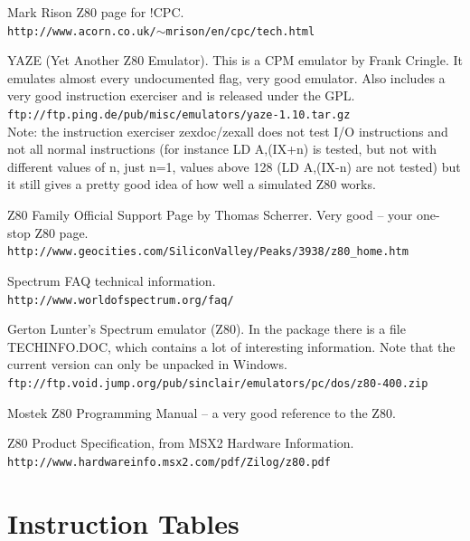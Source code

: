 \documentclass[oneside,a4paper]{book}
\begin{document}
\begin{thebibliography}{}

   Mark Rison Z80 page for !CPC. \\
   {\tt \small http://www.acorn.co.uk/$\sim$mrison/en/cpc/tech.html}

  YAZE (Yet Another Z80 Emulator). This is a CPM emulator 
   by Frank Cringle. It emulates almost every undocumented flag, very good
   emulator. Also includes a very good instruction exerciser and is released
   under the GPL. \\
   {\tt \small ftp://ftp.ping.de/pub/misc/emulators/yaze-1.10.tar.gz} \\
   Note: the instruction exerciser zexdoc/zexall does not test I/O instructions 
   and not all normal instructions (for instance LD A,(IX+n) is tested, but not 
   with different values of n, just n=1, values above 128 (LD A,(IX-n) are not 
   tested) but it still gives a pretty good idea of how well a simulated Z80 
   works.
   
  Z80 Family Official Support Page by Thomas Scherrer. Very 
   good -- your one-stop Z80 page. \\
   {\tt \small http://www.geocities.com/SiliconValley/Peaks/3938/z80\_home.htm}

  Spectrum FAQ technical information. \\
   {\tt \small http://www.worldofspectrum.org/faq/}

  Gerton Lunter's Spectrum emulator (Z80). In the package 
   there is a file TECHINFO.DOC, which contains a lot of interesting 
   information. Note that the current version can only be unpacked in
   Windows. \\
   {\tt \small ftp://ftp.void.jump.org/pub/sinclair/emulators/pc/dos/z80-400.zip}

  Mostek Z80 Programming Manual -- a very good reference
   to the Z80.

  Z80 Product Specification, from MSX2 Hardware Information. \\
   {\tt \small http://www.hardwareinfo.msx2.com/pdf/Zilog/z80.pdf}

\end{thebibliography}

\chapter{Instruction Tables}
\end{document}
